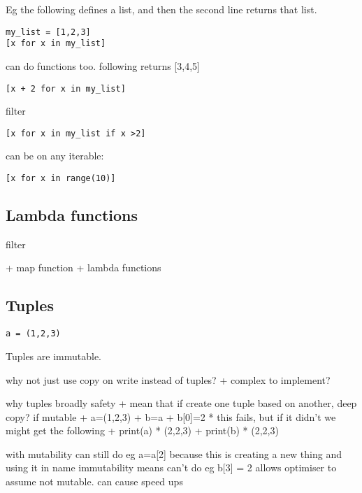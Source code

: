Eg the following defines a list, and then the second line returns that list.

\begin{verbatim}
my_list = [1,2,3]
[x for x in my_list]
\end{verbatim}

can do functions too. following returns [3,4,5]
\begin{verbatim}
[x + 2 for x in my_list]
\end{verbatim}

filter

\begin{verbatim}
[x for x in my_list if x >2]
\end{verbatim}

can be on any iterable:

\begin{verbatim}
[x for x in range(10)]
\end{verbatim}

\subsection{Lambda functions}
filter

+ map function
+ lambda functions

\subsection{Tuples}

\begin{verbatim}
a = (1,2,3)
\end{verbatim}

Tuples are immutable.

why not just use copy on write instead of tuples?
+ complex to implement?

why tuples
broadly safety
+ mean that if create one tuple based on another, deep copy?
if mutable
+ a=(1,2,3)
+ b=a
+ b[0]=2
  * this fails, but if it didn't we might get the following
+ print(a)
  * (2,2,3)
+ print(b)
  * (2,2,3)

with mutability can still do eg a=a[2] because this is creating a new thing and using it in name
immutability means can't do eg b[3] = 2
allows optimiser to assume not mutable. can cause speed ups

